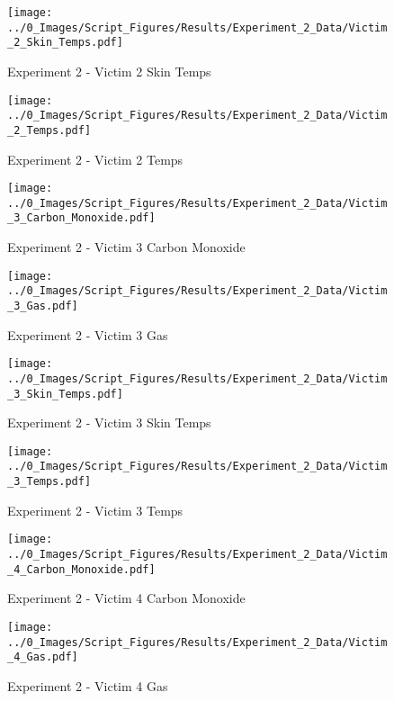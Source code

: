 	\begin{figure}[H]
		\centering
		\texttt{[image: ../0\_Images/Script\_Figures/Results/Experiment\_2\_Data/Victim\_2\_Skin\_Temps.pdf]}
		\caption[]{Experiment 2 - Victim 2 Skin Temps}
	\end{figure}
 
	\clearpage

	\begin{figure}[H]
		\centering
		\texttt{[image: ../0\_Images/Script\_Figures/Results/Experiment\_2\_Data/Victim\_2\_Temps.pdf]}
		\caption[]{Experiment 2 - Victim 2 Temps}
	\end{figure}
 

	\begin{figure}[H]
		\centering
		\texttt{[image: ../0\_Images/Script\_Figures/Results/Experiment\_2\_Data/Victim\_3\_Carbon\_Monoxide.pdf]}
		\caption[]{Experiment 2 - Victim 3 Carbon Monoxide}
	\end{figure}
 
	\clearpage

	\begin{figure}[H]
		\centering
		\texttt{[image: ../0\_Images/Script\_Figures/Results/Experiment\_2\_Data/Victim\_3\_Gas.pdf]}
		\caption[]{Experiment 2 - Victim 3 Gas}
	\end{figure}
 

	\begin{figure}[H]
		\centering
		\texttt{[image: ../0\_Images/Script\_Figures/Results/Experiment\_2\_Data/Victim\_3\_Skin\_Temps.pdf]}
		\caption[]{Experiment 2 - Victim 3 Skin Temps}
	\end{figure}
 
	\clearpage

	\begin{figure}[H]
		\centering
		\texttt{[image: ../0\_Images/Script\_Figures/Results/Experiment\_2\_Data/Victim\_3\_Temps.pdf]}
		\caption[]{Experiment 2 - Victim 3 Temps}
	\end{figure}
 

	\begin{figure}[H]
		\centering
		\texttt{[image: ../0\_Images/Script\_Figures/Results/Experiment\_2\_Data/Victim\_4\_Carbon\_Monoxide.pdf]}
		\caption[]{Experiment 2 - Victim 4 Carbon Monoxide}
	\end{figure}
 
	\clearpage

	\begin{figure}[H]
		\centering
		\texttt{[image: ../0\_Images/Script\_Figures/Results/Experiment\_2\_Data/Victim\_4\_Gas.pdf]}
		\caption[]{Experiment 2 - Victim 4 Gas}
	\end{figure}
 

